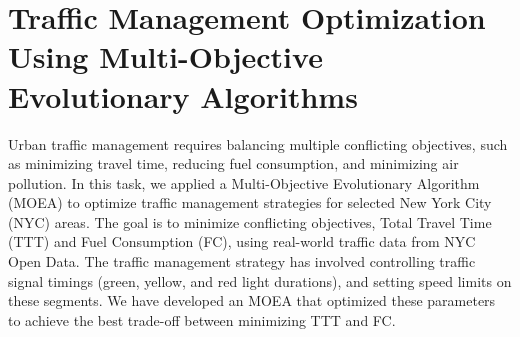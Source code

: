 \section{Traffic Management Optimization Using Multi-Objective Evolutionary Algorithms}

Urban traffic management requires balancing multiple conflicting objectives, such as minimizing travel time, reducing fuel consumption, and minimizing air pollution. 
\newline
\newline
In this task, we applied a Multi-Objective Evolutionary Algorithm (MOEA) to optimize traffic management strategies for selected New York City (NYC) areas. The goal is to minimize conflicting 
objectives, Total Travel Time (TTT) and Fuel Consumption (FC), using real-world traffic data from NYC Open Data.
\newline
\newline
The traffic management strategy has involved controlling traffic signal timings (green, yellow, and red light durations), and setting speed limits on these segments. We have developed an MOEA that optimized these parameters to achieve the best trade-off between minimizing TTT and FC.
\newline
